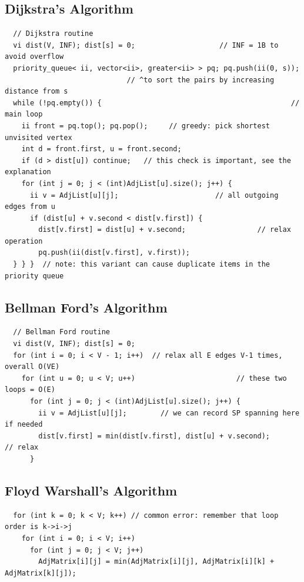 \documentclass[10pt,landscape]{article}
\begin{document}
\begin{multicols}{2}
\subsection{Dijkstra's Algorithm}
\begin{lstlisting}
  // Dijkstra routine
  vi dist(V, INF); dist[s] = 0;                    // INF = 1B to avoid overflow
  priority_queue< ii, vector<ii>, greater<ii> > pq; pq.push(ii(0, s));
                             // ^to sort the pairs by increasing distance from s
  while (!pq.empty()) {                                             // main loop
    ii front = pq.top(); pq.pop();     // greedy: pick shortest unvisited vertex
    int d = front.first, u = front.second;
    if (d > dist[u]) continue;   // this check is important, see the explanation
    for (int j = 0; j < (int)AdjList[u].size(); j++) {
      ii v = AdjList[u][j];                       // all outgoing edges from u
      if (dist[u] + v.second < dist[v.first]) {
        dist[v.first] = dist[u] + v.second;                 // relax operation
        pq.push(ii(dist[v.first], v.first));
  } } }  // note: this variant can cause duplicate items in the priority queue
\end{lstlisting}

\subsection{Bellman Ford's Algorithm}
\begin{lstlisting}
  // Bellman Ford routine
  vi dist(V, INF); dist[s] = 0;
  for (int i = 0; i < V - 1; i++)  // relax all E edges V-1 times, overall O(VE)
    for (int u = 0; u < V; u++)                        // these two loops = O(E)
      for (int j = 0; j < (int)AdjList[u].size(); j++) {
        ii v = AdjList[u][j];        // we can record SP spanning here if needed
        dist[v.first] = min(dist[v.first], dist[u] + v.second);         // relax
      }
\end{lstlisting}

\subsection{Floyd Warshall's Algorithm}
\begin{lstlisting}
  for (int k = 0; k < V; k++) // common error: remember that loop order is k->i->j
    for (int i = 0; i < V; i++)
      for (int j = 0; j < V; j++)
        AdjMatrix[i][j] = min(AdjMatrix[i][j], AdjMatrix[i][k] + AdjMatrix[k][j]);
\end{lstlisting}


\end{multicols}
\end{document}
